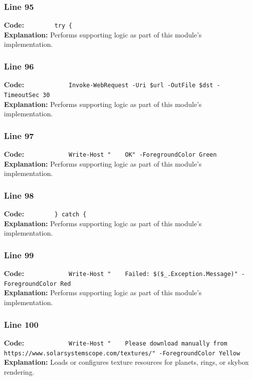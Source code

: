 \documentclass[11pt,a4paper]{article}
\begin{document}
\subsubsection*{Line 95}
\textbf{Code:} \verb|        try {|\\
\textbf{Explanation:} Performs supporting logic as part of this module's implementation.

\subsubsection*{Line 96}
\textbf{Code:} \verb|            Invoke-WebRequest -Uri $url -OutFile $dst -TimeoutSec 30|\\
\textbf{Explanation:} Performs supporting logic as part of this module's implementation.

\subsubsection*{Line 97}
\textbf{Code:} \verb|            Write-Host "    OK" -ForegroundColor Green|\\
\textbf{Explanation:} Performs supporting logic as part of this module's implementation.

\subsubsection*{Line 98}
\textbf{Code:} \verb|        } catch {|\\
\textbf{Explanation:} Performs supporting logic as part of this module's implementation.

\subsubsection*{Line 99}
\textbf{Code:} \verb|            Write-Host "    Failed: $($_.Exception.Message)" -ForegroundColor Red|\\
\textbf{Explanation:} Performs supporting logic as part of this module's implementation.

\subsubsection*{Line 100}
\textbf{Code:} \verb|            Write-Host "    Please download manually from https://www.solarsystemscope.com/textures/" -ForegroundColor Yellow|\\
\textbf{Explanation:} Loads or configures texture resources for planets, rings, or skybox rendering.
\end{document}
